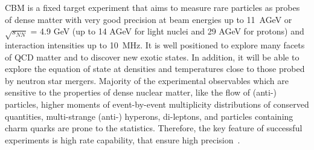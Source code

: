 \gls{CBM} is a fixed target experiment that aims to measure rare particles as probes of dense matter with very good precision at beam energies up to 11~AGeV or $\sqrt{s_{NN}}$ = 4.9 GeV (up to 14 AGeV for light nuclei and 29 AGeV for protons) and interaction intensities up to 10~MHz.
\newpage
It is well positioned to explore many facets of \gls{QCD} matter and to discover new exotic states. In addition, it will be able to explore the equation of state at densities and temperatures close to those probed by neutron star mergers. Majority of the experimental observables which are sensitive to the properties of dense nuclear matter, like the flow of (anti-) particles, higher moments of event-by-event multiplicity distributions of conserved quantities, multi-strange (anti-) hyperons, di-leptons, and particles containing charm quarks are prone to the statistics. Therefore, the key feature of successful experiments is high rate capability, that ensure high precision~\cite{Ablyazimov_2017}. 

